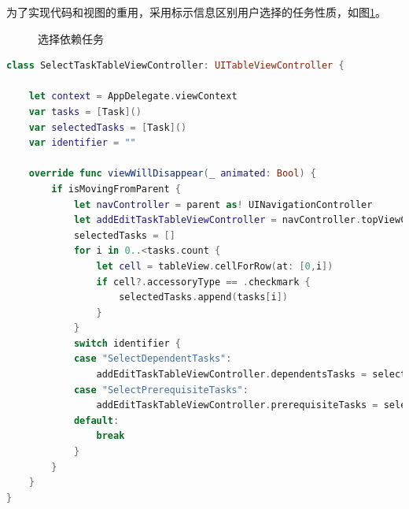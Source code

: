 为了实现代码和视图的重用，采用标示信息区别用户选择的任务性质，如图\ref{fig:select_prerequisites_tasks}。

\begin{figure}[!hbp]
	\centering
	\caption{选择依赖任务}
	\label{fig:select_prerequisites_tasks}
\end{figure}

\begin{lstlisting}[language={Swift}, caption={选择任务界面的代码}]
class SelectTaskTableViewController: UITableViewController {

    let context = AppDelegate.viewContext
    var tasks = [Task]()
    var selectedTasks = [Task]()
    var identifier = ""
    
    override func viewWillDisappear(_ animated: Bool) {
        if isMovingFromParent {
            let navController = parent as! UINavigationController
            let addEditTaskTableViewController = navController.topViewController as! AddEditTaskTableViewController
            selectedTasks = []
            for i in 0..<tasks.count {
                let cell = tableView.cellForRow(at: [0,i])
                if cell?.accessoryType == .checkmark {
                    selectedTasks.append(tasks[i])
                }
            }
            switch identifier {
            case "SelectDependentTasks":
                addEditTaskTableViewController.dependentsTasks = selectedTasks
            case "SelectPrerequisiteTasks":
                addEditTaskTableViewController.prerequisiteTasks = selectedTasks
            default:
                break
            }
        }
    }
}
\end{lstlisting}

